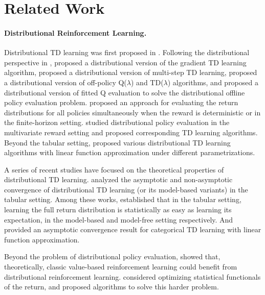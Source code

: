 \section{Related Work}
\paragraph{Distributional Reinforcement Learning.}
Distributional TD learning was first proposed in \citep{bellemare2017distributional}.
Following the distributional perspective in \citep{bellemare2017distributional}, \cite{pmlr-v97-qu19b} proposed a distributional version of the gradient TD learning algorithm,
\cite{tang2022nature} proposed a distributional version of multi-step TD learning, \cite{tang2024off} proposed a distributional version of off-policy Q($\lambda$) and TD($\lambda$) algorithms, and \citet{pmlr-v202-wu23s} proposed a distributional version of fitted Q evaluation to solve the distributional offline policy evaluation problem.
\cite{wiltzer2024dsm} proposed an approach for evaluating the return distributions for all policies simultaneously when the reward is deterministic or in the finite-horizon setting. 
\cite{wiltzer2024foundations} studied distributional policy evaluation in the multivariate reward setting and proposed corresponding TD learning algorithms.
Beyond the tabular setting, \cite{bellemare2019distributional,lyle2019comparative,bdr2022} proposed various distributional TD learning algorithms with linear function approximation under different parametrizations.

A series of recent studies have focused on the theoretical properties of distributional TD learning.
\cite{rowland2018analysis,speedy,zhang2023estimation,rowland2024analysis,rowland2024nearminimaxoptimal,peng2024statistical} analyzed the asymptotic and non-asymptotic convergence of distributional TD learning (or its model-based variants) in the tabular setting.
Among these works, \cite{rowland2024nearminimaxoptimal,peng2024statistical} established that in the tabular setting, learning the full return distribution is statistically as easy as learning its expectation, in the model-based and model-free setting respectively.
And \cite{bellemare2019distributional} provided an asymptotic convergence result for categorical TD learning with linear function approximation.

Beyond the problem of distributional policy evaluation,
\cite{rowland2023statistical,NEURIPS2023_06fc38f5, wang2024more} showed that, theoretically, classic value-based reinforcement learning could benefit from distributional reinforcement learning.
\cite{bauerle2011markov,chow2014algorithms,marthe2023beyond,noorani2023exponential,pires2025optimizing} considered optimizing statistical functionals of the return, and proposed algorithms to solve this harder problem.


